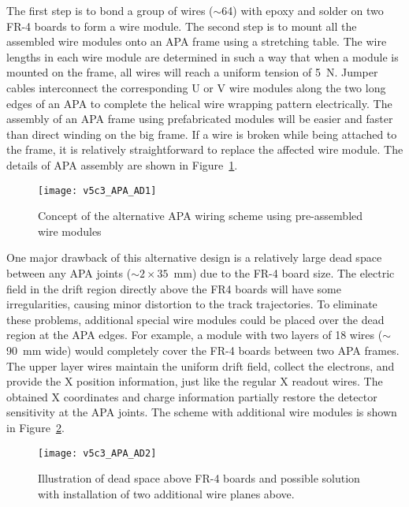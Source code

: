 The first step is to bond a group of wires ($\sim$64) with epoxy and solder on two FR-4 boards to form a wire module.   The second step is to mount all the assembled wire modules onto an APA frame using a stretching table.  The wire lengths in each wire module are determined in such a way that when a module is mounted on the frame, all wires will reach a uniform tension of 5~N.  Jumper cables interconnect the corresponding U or V wire modules along the two long edges of an APA to complete the helical wire wrapping pattern electrically.
The assembly of an APA frame  using prefabricated modules will be easier and faster than direct winding on the big frame.  If a wire is broken while being attached to the frame, it is relatively straightforward to replace the affected wire module. The details of APA assembly are shown in Figure~\ref{fig:tpc-APA-AD1}.  
 
\begin{figure}[htpb]
\centering
\texttt{[image: v5c3\_APA\_AD1]}
\caption[Concept of the alternative APA wiring scheme]{Concept of the alternative APA wiring scheme using pre-assembled wire modules}
\label{fig:tpc-APA-AD1}
\end{figure}

One major drawback of this alternative design is a relatively large dead space between any APA joints ($\sim 2 \times 35$~mm) due to the FR-4 board size.  The electric field in the drift region directly above the FR4 boards will have some irregularities, causing minor distortion to the track trajectories. To eliminate these problems, additional special wire modules could be placed over the dead region at the APA edges. For example, a module with two layers of 18 wires ($\sim$90~mm wide) would completely cover the FR-4 boards between two APA frames. The upper layer wires maintain the uniform drift field, collect the electrons, and provide the X position information, just like the regular X readout wires. The obtained X coordinates and charge information partially restore the detector sensitivity at the APA joints. The scheme with additional wire modules is shown in Figure~\ref{fig:tpc-APA-AD2}. 
                   
\begin{figure}[htpb]
\centering
\texttt{[image: v5c3\_APA\_AD2]}
\caption[Illustration of dead space above FR-4 boards and possible solution]{Illustration of dead space above FR-4 boards and possible solution with installation of two additional wire planes above.}
\label{fig:tpc-APA-AD2}
\end{figure}


